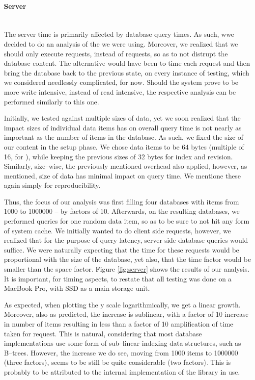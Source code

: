 \paragraph{Server} ~\\
The server time is primarily affected by database query times.
As such, wwe decided to do an analysis of the  we were using.
Moreover, we realized that we should only execute  requests, instead of  requests, so as to not distrupt the database content.
The alternative would have been to time each  request and then bring the database back to the previous state, on every instance of testing, which we considered needlessly complicated, for now.
Should the system prove to be more write intensive, instead of read intensive, the respective analysis can be performed similarly to this one.

Initially, we tested against multiple sizes of data, yet we soon realized that the impact sizes of individual data items has on overall query time is not nearly as important as the number of items in the database.
As such, we fixed the size of our content in the setup phase.
We chose data items to be 64 bytes (multiple of 16, for ), while keeping the previous sizes of 32 bytes for index and revision.
Similarly, size--wise, the previously mentioned overhead also applied, however, as mentioned, size of data has minimal impact on query time.
We mentione these again simply for reproducibility.

Thus, the focus of our analysis was first filling four databases with items from 1000 to 1000000 -- by factors of 10.
Afterwards, on the resulting databases, we performed queries for one random data item, so as to be sure to not hit any form of system cache.
We initially wanted to do client side  requests, however, we realized that for the purpose of query latency, server side database queries would suffice.
We were naturally expecting that the time for these requests would be proportional with the size of the database, yet also, that the time factor would be smaller than the space factor.
Figure \ref{fig:server} shows the results of our analysis.
It is important, for timing aspects, to restate that all testing was done on a MacBook Pro, with SSD as a main storage unit.


As expected, when plotting the y scale logarithmically, we get a linear growth.
Moreover, also as predicted, the increase is sublinear, with a factor of 10 increase in number of items resulting in less than a factor of 10 amplification of time taken for request.
This is natural, considering that most database implementations use some form of sub--linear indexing data structures, such as B--trees.
However, the increase we do see, moving from 1000 items to 1000000 (three factors), seems to be still be quite considerable (two factors).
This is probably to be attributed to the internal implementation of the library in use.

